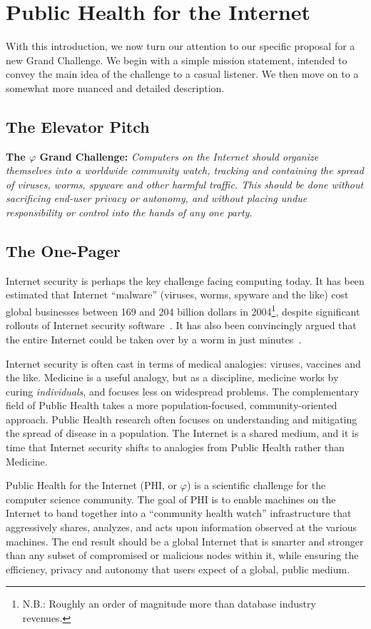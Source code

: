 \documentclass{acm_proc_article-sp}
\def\philogo{{\large $\varphi$}\xspace}
\begin{document}
\section{Public Health for the Internet} With this introduction, we now turn our attention to our specific proposal for a new Grand Challenge. We begin with a simple mission statement, intended to convey the main idea of the challenge to a casual listener. We then move on to a somewhat more nuanced and detailed description.

\subsection{The Elevator Pitch} {\bf The \philogo Grand Challenge:} {\em Computers on the Internet should organize themselves into a worldwide community watch, tracking and containing the spread of viruses, worms, spyware and other harmful traffic. This should be done without sacrificing end-user privacy or autonomy, and without placing undue responsibility or control into the hands of any one party.}

\subsection{The One-Pager} Internet security is perhaps the key challenge facing computing today. It has been estimated that Internet ``malware'' (viruses, worms, spyware and the like) cost global businesses between 169 and 204 billion dollars in 2004\footnote{N.B.: Roughly an order of magnitude more than database industry revenues.}, despite significant rollouts of Internet security software~\cite{malware-report}. It has also been convincingly argued that the entire Internet could be taken over by a worm in just minutes~\cite{sparetime}.

Internet security is often cast in terms of medical analogies: viruses, vaccines and the like. Medicine is a useful analogy, but as a discipline, medicine works by curing {\em individuals}, and focuses less on widespread problems. The complementary field of Public Health takes a more population-focused, community-oriented approach. Public Health research often focuses on understanding and mitigating the spread of disease in a population. The Internet is a shared medium, and it is time that Internet security shifts to analogies from Public Health rather than Medicine.

Public Health for the Internet (PHI, or \philogo) is a scientific challenge for the computer science community. The goal of PHI is to enable machines on the Internet to band together into a ``community health watch'' infrastructure that aggressively shares, analyzes, and acts upon information observed at the various machines. The end result should be a global Internet that is smarter and stronger than any subset of compromised or malicious nodes within it, while ensuring the efficiency, privacy and autonomy that users expect of a global, public medium.
\end{document}
